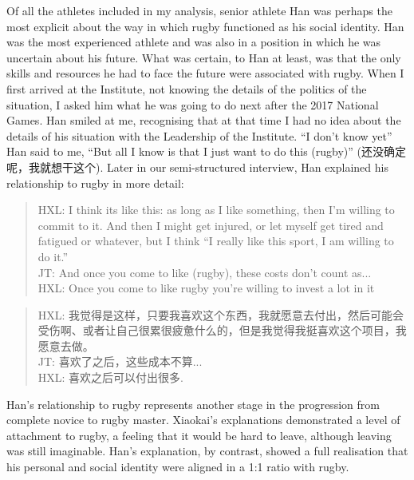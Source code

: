 \begin{CJK}{UTF8}{gbsn}
Of all the athletes included in my analysis, senior athlete Han was perhaps the most explicit about the way in which rugby functioned as his social identity.  Han was the most experienced athlete and was also in a position in which he was uncertain about his future. What was certain, to Han at least, was that the only skills and resources he had to face the future were associated with rugby.   When I first arrived at the Institute, not knowing the details of the politics of the situation, I asked him what he was going to do next after the 2017 National Games.  Han smiled at me, recognising that at that time I had no idea about the details of his situation with the Leadership of the Institute. ``I don't know yet'' Han said to me, ``But all I know is that I just want to do this (rugby)'' (还没确定呢，我就想干这个).  Later in our semi-structured interview, Han explained his relationship to rugby in more detail:

    \begin{quote}
      HXL: I think its like this: as long as I like something, then I’m willing to commit to it.  And then I might get injured, or let myself get tired and fatigued or whatever, but I think ``I really like this sport, I am willing to do it.''\\
      JT: And once you come to like (rugby), these costs don't count as...\\
      HXL: Once you come to like rugby you're willing to invest a lot in it
    \end{quote}

    \begin{quote}
      HXL: 我觉得是这样，只要我喜欢这个东西，我就愿意去付出，然后可能会受伤啊、或者让自己很累很疲惫什么的，但是我觉得我挺喜欢这个项目，我愿意去做。\\
      JT: 喜欢了之后，这些成本不算...\\
      HXL: 喜欢之后可以付出很多.
    \end{quote}

Han's relationship to rugby represents another stage in the progression from complete novice to rugby master.  Xiaokai's explanations demonstrated a level of attachment to rugby, a feeling that it would be hard to leave, although leaving was still imaginable. Han's explanation, by contrast, showed a full realisation that his personal and social identity were aligned in a 1:1 ratio with rugby.



\end{CJK}
